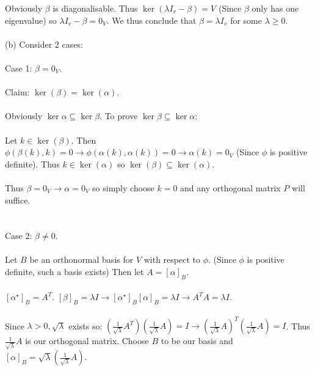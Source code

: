 \documentclass{article}
\begin{document}
Obviously $\beta$ is diagonalisable. Thus $\ker(\lambda I_v-\beta) = V$ (Since $\beta$ only has one eigenvalue) so $\lambda I_v - \beta = 0_V.$ We thus conclude that $\beta = \lambda I_v$ for some $\lambda \geq 0$. \\\\
(b) Consider 2 cases:\\\\
Case 1: $\beta = 0_V$.\\\\
Claim: $\ker(\beta) = \ker(\alpha).$\\\\
Obviously $\ker \alpha \subseteq \ker \beta.$ To prove $\ker \beta \subseteq \ker \alpha:$\\\\
Let $k \in \ker(\beta).$ Then $\phi(\beta(k),k) = 0 \to \phi(\alpha(k),\alpha(k)) = 0 \to \alpha(k) = 0_V$ (Since $\phi$ is positive definite). Thus $k \in \ker(\alpha)$ so $\ker(\beta)\subseteq\ker(\alpha).$\\\\
Thus $\beta = 0_V \to \alpha = 0_V$ so simply choose $k = 0$ and any orthogonal matrix $P$ will suffice.\\\\\\ Case 2: $\beta \neq 0$.\\\\ Let $B$ be an orthonormal basis for $V$ with respect to $\phi$. (Since $\phi$ is positive definite, such a basis exists) Then let $A = [\alpha]_B$.\\\\
$[\alpha^\star]_B = A^T$. $[\beta]_B = \lambda I \to [\alpha^\star]_B [\alpha]_B = \lambda I \to A^TA = \lambda I.$\\\\
Since $\lambda > 0,\sqrt{\lambda} $ exists so: $(\frac{1}{\sqrt{\lambda}}A^T)(\frac{1}{\sqrt{\lambda}}A) = I \to (\frac{1}{\sqrt{\lambda}}A)^T(\frac{1}{\sqrt{\lambda}}A) = I$. Thus $\frac{1}{\sqrt{\lambda}}A$ is our orthogonal matrix. Choose $B$ to be our basis and $[\alpha]_B = \sqrt{\lambda}(\frac{1}{\sqrt{\lambda}}A).$\\\\
\end{document}
